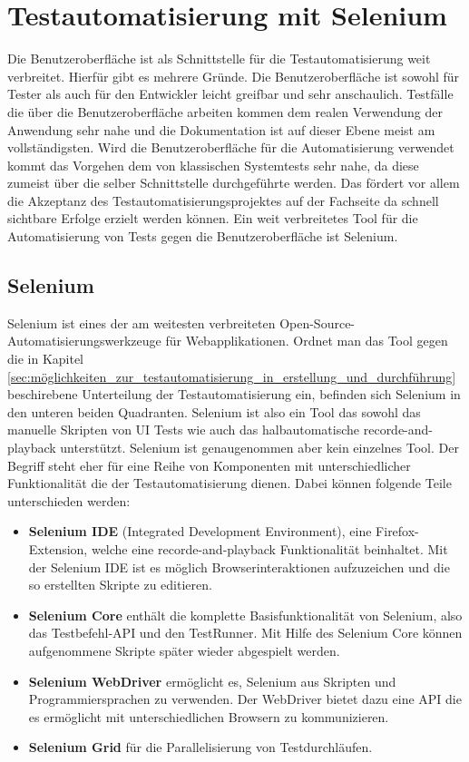 \chapter{Testautomatisierung mit Selenium}
\label{sec:testautomatisierung_mit_selenium}
Die Benutzeroberfläche ist als Schnittstelle für die Testautomatisierung weit verbreitet. Hierfür gibt es mehrere Gründe. Die Benutzeroberfläche ist sowohl für Tester als auch für den Entwickler leicht greifbar und sehr anschaulich. Testfälle die über die Benutzeroberfläche arbeiten kommen dem realen Verwendung der Anwendung sehr nahe und die Dokumentation ist auf dieser Ebene meist am vollständigsten. Wird die Benutzeroberfläche für die Automatisierung verwendet kommt das Vorgehen dem von klassischen Systemtests sehr nahe, da diese zumeist über die selber Schnittstelle durchgeführte werden. \cite[vgl. Seite 48]{seidl_basiswissen_2012} Das fördert vor allem die Akzeptanz des Testautomatisierungsprojektes auf der Fachseite da schnell sichtbare Erfolge erzielt werden können. 
Ein weit verbreitetes Tool für die Automatisierung von Tests gegen die Benutzeroberfläche ist Selenium.

\section{Selenium}
\label{sec:selenium}
Selenium ist eines der am weitesten verbreiteten Open-Source-Automatisierungswerkzeuge für Webapplikationen. Ordnet man das Tool gegen die in Kapitel \ref{sec:möglichkeiten_zur_testautomatisierung_in_erstellung_und_durchführung} beschirebene Unterteilung der Testautomatisierung ein, befinden sich Selenium in den unteren beiden Quadranten.
Selenium ist also ein Tool das sowohl das manuelle Skripten von UI Tests wie auch das halbautomatische recorde-and-playback unterstützt. Selenium ist genaugenommen aber kein einzelnes Tool. Der Begriff steht eher für eine Reihe von Komponenten mit unterschiedlicher Funktionalität die der Testautomatisierung dienen. Dabei können folgende Teile unterschieden werden:

\begin{itemize}
	  \itemsep0pt
      \item \textbf{Selenium IDE} (Integrated Development Environment), eine Firefox-Extension, welche eine recorde-and-playback Funktionalität beinhaltet. Mit der Selenium IDE ist es möglich Browserinteraktionen aufzuzeichen und die so erstellten Skripte zu editieren.
      \item \textbf{Selenium Core} enthält die komplette Basisfunktionalität von Selenium, also das Testbefehl-API und den TestRunner. Mit Hilfe des Selenium Core können aufgenommene Skripte später wieder abgespielt werden.
      \item \textbf{Selenium WebDriver} ermöglicht es, Selenium aus Skripten und Programmiersprachen zu verwenden. Der WebDriver bietet dazu eine API die es ermöglicht mit unterschiedlichen Browsern zu kommunizieren.
      \item \textbf{Selenium Grid} für die Parallelisierung von Testdurchläufen.     
\end{itemize}


